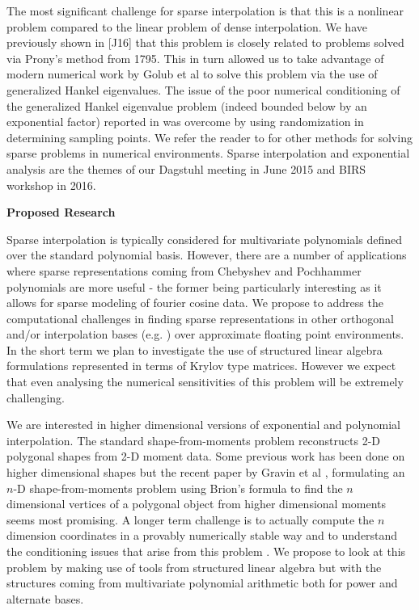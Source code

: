 The most significant challenge for sparse interpolation is that this is a nonlinear problem compared to the linear problem of dense interpolation. We have previously shown in [J16] that this problem is closely related to problems solved via Prony's method from 1795. This in turn allowed us to take advantage of modern numerical work by Golub et al \cite{golub1} to solve this problem via the use of generalized Hankel eigenvalues. The issue of the poor numerical conditioning of the generalized Hankel eigenvalue problem (indeed bounded below by an exponential factor) reported in  \cite{begola} was overcome by using randomization in determining sampling points. We refer the reader to 
 \cite{potts} for other methods for solving sparse problems in numerical environments.
Sparse interpolation and exponential analysis are the themes of our Dagstuhl meeting in June 2015 and BIRS workshop in 2016.

\bigskip
\noindent
{\bf Proposed Research}
\bigskip

Sparse interpolation is typically considered for multivariate polynomials defined over the standard polynomial basis. However, there are a number of applications where sparse representations coming from Chebyshev and Pochhammer polynomials \cite{gll2,potts2} are more useful - the former being particularly interesting as it allows for sparse modeling of fourier cosine data. We propose to address the computational challenges in finding sparse representations in other orthogonal and/or interpolation bases (e.g. \cite{corless}) over approximate floating point environments. In the short term we plan to investigate the use of structured linear algebra formulations represented in terms of Krylov type matrices. However we expect that even analysing the numerical sensitivities of this problem will be extremely challenging. 

We are interested in higher dimensional versions of exponential and polynomial interpolation. The standard shape-from-moments problem reconstructs 2-D polygonal shapes from 2-D moment data. Some previous work has been done on higher dimensional shapes \cite{cuyt} but the recent paper by Gravin et al \cite{lasserre}, formulating an $n$-D shape-from-moments problem using Brion's formula to find the $n$ dimensional vertices of a polygonal object from higher dimensional moments seems most promising. A longer term challenge is to actually compute the $n$ dimension coordinates in a provably numerically stable way and to understand the conditioning issues that arise from this problem \cite{cchlc}. We propose to look at this problem by making use of tools from structured linear algebra but with the structures coming from multivariate polynomial arithmetic both for power and alternate bases. 

